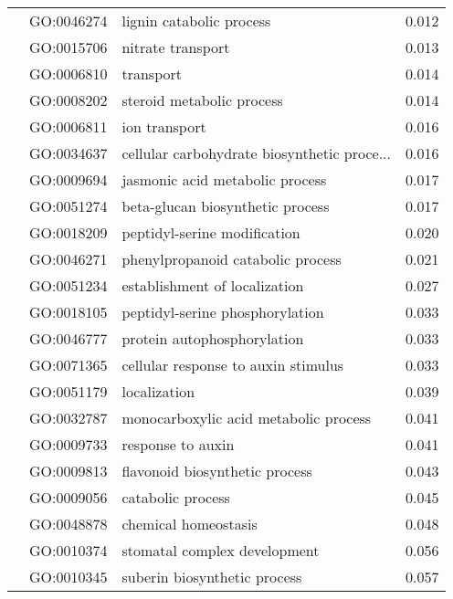\begin{longtable}{lllr}
   & GO:0046274 &                     lignin catabolic process &         0.012 \\
   & GO:0015706 &                            nitrate transport &         0.013 \\
   & GO:0006810 &                                    transport &         0.014 \\
   & GO:0008202 &                    steroid metabolic process &         0.014 \\
   & GO:0006811 &                                ion transport &         0.016 \\
   & GO:0034637 &  cellular carbohydrate biosynthetic proce... &         0.016 \\
   & GO:0009694 &              jasmonic acid metabolic process &         0.017 \\
   & GO:0051274 &             beta-glucan biosynthetic process &         0.017 \\
   & GO:0018209 &                 peptidyl-serine modification &         0.020 \\
   & GO:0046271 &            phenylpropanoid catabolic process &         0.021 \\
   & GO:0051234 &                establishment of localization &         0.027 \\
   & GO:0018105 &              peptidyl-serine phosphorylation &         0.033 \\
   & GO:0046777 &                  protein autophosphorylation &         0.033 \\
   & GO:0071365 &          cellular response to auxin stimulus &         0.033 \\
   & GO:0051179 &                                 localization &         0.039 \\
   & GO:0032787 &        monocarboxylic acid metabolic process &         0.041 \\
   & GO:0009733 &                            response to auxin &         0.041 \\
   & GO:0009813 &               flavonoid biosynthetic process &         0.043 \\
   & GO:0009056 &                            catabolic process &         0.045 \\
   & GO:0048878 &                         chemical homeostasis &         0.048 \\
   & GO:0010374 &                 stomatal complex development &         0.056 \\
   & GO:0010345 &                 suberin biosynthetic process &         0.057 \\

\end{longtable}
